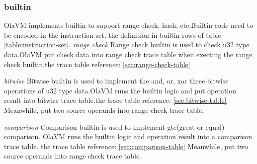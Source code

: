 \subsubsection{builtin}\label{subsec: instructions-builtin}
OlaVM implements builtin to support range check, hash, etc.Builtin code need to be encoded in the instruction set, the definition in builtin rows of table \ref{table:instruction-set}.
\emph{range check}
Range check builtin is used to check u32 type data.OlaVM put check data into range check trace table when execting the range check builtin.the trace table reference: \ref{sec:range-check-table}

\emph{bitwise}
Bitwise builtin is used to implement the and, or, xor three bitwise operations of u32 type data.OlaVM runs the builtin logic and put operation result into bitwise trace table.the trace table reference: \ref{sec:bitwise-table}
Meanwhile, put two source operands into range check trace table.

\emph{comparison}
Comparison builtin is used to implement gte(great or equal) comparison. OlaVM runs the builtin logic and operation result into a comparison trace table. the trace table reference: \ref{sec:comparison-table}
Meanwhile, put two source operands into range check trace table.